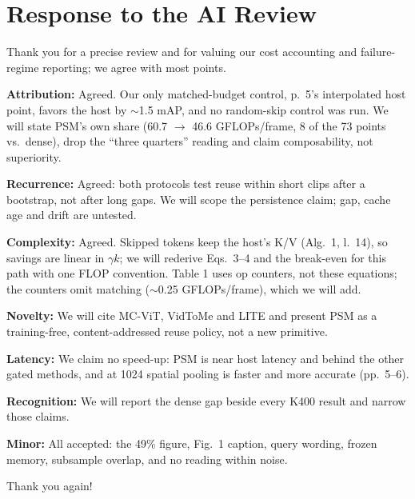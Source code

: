 \section*{Response to the AI Review}

Thank you for a precise review and for valuing our cost accounting and failure-regime reporting; we agree with most points.

\textbf{Attribution:} Agreed. Our only matched-budget control, p.~5's interpolated host point, favors the host by $\sim$1.5 mAP, and no random-skip control was run. We will state PSM's own share (60.7 $\rightarrow$ 46.6 GFLOPs/frame, 8 of the 73 points vs.\ dense), drop the ``three quarters'' reading and claim composability, not superiority.

\textbf{Recurrence:} Agreed: both protocols test reuse within short clips after a bootstrap, not after long gaps. We will scope the persistence claim; gap, cache age and drift are untested.

\textbf{Complexity:} Agreed. Skipped tokens keep the host's K/V (Alg.~1, l.~14), so savings are linear in $\gamma k$; we will rederive Eqs.~3--4 and the break-even for this path with one FLOP convention. Table 1 uses op counters, not these equations; the counters omit matching ($\sim$0.25 GFLOPs/frame), which we will add.

\textbf{Novelty:} We will cite MC-ViT, VidToMe and LITE and present PSM as a training-free, content-addressed reuse policy, not a new primitive.

\textbf{Latency:} We claim no speed-up: PSM is near host latency and behind the other gated methods, and at 1024 spatial pooling is faster and more accurate (pp.~5--6).

\textbf{Recognition:} We will report the dense gap beside every K400 result and narrow those claims.

\textbf{Minor:} All accepted: the 49\% figure, Fig.~1 caption, query wording, frozen memory, subsample overlap, and no reading within noise.

Thank you again!
